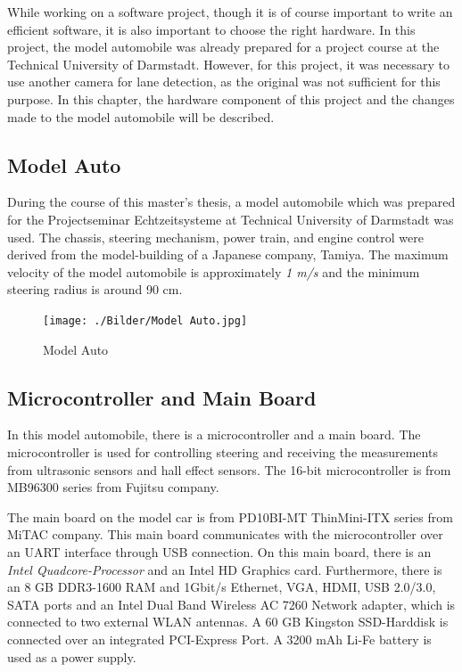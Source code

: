 While working on a software project, though it is of course important to write an efficient software, it is also important to choose the right hardware. In this project, the model automobile was already prepared for a project course at the Technical University of Darmstadt. However, for this project, it was necessary to use another camera for lane detection, as the original was not sufficient for this purpose. In this chapter, the hardware component of this project and the changes made to the model automobile will be described.


%
\subsection{Model Auto}\label{sec:Model Auto}


During the course of this master's thesis, a model automobile which was prepared for the Projectseminar Echtzeitsysteme at Technical University of Darmstadt was used. The chassis, steering mechanism, power train, and engine control were derived from the model-building of a Japanese company, Tamiya. The maximum velocity of the model automobile is approximately \emph{\color{green}1 m/s} and the minimum steering radius is around 90 cm. 

\begin{figure}[H]
	\centering
	\hspace*{0cm}   
	\texttt{[image: ./Bilder/Model Auto.jpg]}
	\caption{Model Auto}
\end{figure}

%
\subsection{Microcontroller and Main Board}\label{sec:Microcontroller and Main Board}


In this model automobile, there is a microcontroller and a main board. The microcontroller is used for controlling steering 
and receiving the measurements from ultrasonic sensors and hall effect sensors. The 16-bit microcontroller is from 
MB96300 series from Fujitsu company.

The main board on the model car is from PD10BI-MT ThinMini-ITX series from MiTAC company. This main board communicates 
with the microcontroller over an UART interface through USB connection. On this main board, there is an  \emph{\color{green}Intel Quadcore-Processor} and an Intel HD Graphics card. Furthermore, there is an 8 GB DDR3-1600 RAM and 1Gbit/s Ethernet, VGA, HDMI, USB 2.0/3.0, SATA ports and an Intel Dual Band Wireless AC 7260 Network adapter, which is connected to two external WLAN antennas. A 60 GB Kingston SSD-Harddisk is connected over an integrated PCI-Express Port. A 3200 mAh Li-Fe battery is used as a power supply.
%

